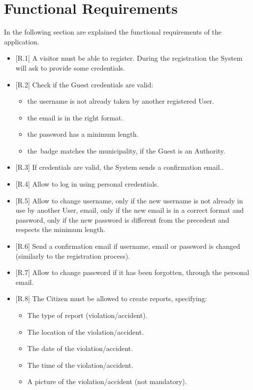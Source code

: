 \documentclass{report}
\begin{document}
\section{Functional Requirements}
In the following section are explained the functional requirements of the application.
\begin{itemize}
	\item {[R.1]} A visitor must be able to register. During the registration the System will ask to provide some credentials.
	\item {[R.2]} Check if the Guest credentials are valid:
		\begin{itemize}
			\item the username is not already taken by another registered User.
			\item the email is in the right format.
			\item the password has a minimum length.
			\item the badge matches the municipality, if the Guest is an Authority.
		\end{itemize}
	\item {[R.3]} If credentials are valid, the System sends a confirmation email..
	\item {[R.4]} Allow to log in using personal credentials.
	\item {[R.5]} Allow to change username, only if the new username is not already in use by another User, email, only if the
	new email is in a correct format and password, only if the new password is different from the precedent and respects the minimum length.
	\item {[R.6]} Send a confirmation email if username, email or password is changed (similarly to the registration process). 
	\item {[R.7]} Allow to change password if it has been forgotten, through the personal email.
	\item {[R.8]} The Citizen must be allowed to create reports, specifying:
		\begin{itemize}
			\item The type of report (violation/accident).
			\item The location of the violation/accident.
			\item The date of the violation/accident.
			\item The time of the violation/accident.
			\item A picture of the violation/accident (not mandatory).
		\end{itemize}

\end{itemize}
\end{document}
